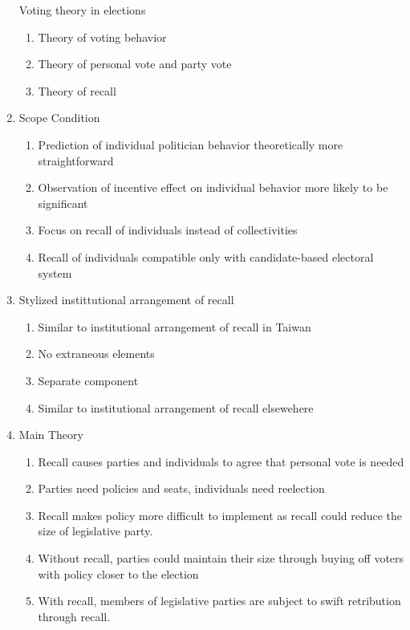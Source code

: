 \documentclass[hyphens, crop=false]{standalone}
\begin{document}
\begin{enumerate}
			Voting theory in elections
			\begin{enumerate}
				\item 
				Theory of voting behavior
				\item 
				Theory of personal vote and party vote
				\item 
				Theory of recall
			\end{enumerate}
			\item 
			Scope Condition
			\begin{enumerate}
				\item 
				Prediction of individual politician behavior theoretically more straightforward
				\item 
				Observation of incentive effect on individual behavior more likely to be significant
				\item 
				Focus on recall of individuals instead of collectivities
				\item 
				Recall of individuals compatible only with candidate-based electoral system
			\end{enumerate}
			\item 
			Stylized instittutional arrangement of recall
			\begin{enumerate}
				\item 
				Similar to institutional arrangement of recall in Taiwan
				\item 
				No extraneous elements
				\item 
				Separate component
				\item 
				Similar to institutional arrangement of recall elsewehere
			\end{enumerate}
			\item 
			Main Theory
			\begin{enumerate}
				\item 
				Recall causes parties and individuals to agree that personal vote is needed
				\item 
				Parties need policies and seats, individuals need reelection
				\item 
				Recall makes policy more difficult to implement
				as recall could reduce the size of legislative party.
				\item 
				Without recall, parties could maintain their size through buying off voters with policy closer to the election
				\item 
				With recall, members of legislative parties are subject to swift retribution through recall.
			\end{enumerate}

\end{enumerate}
\end{document}

